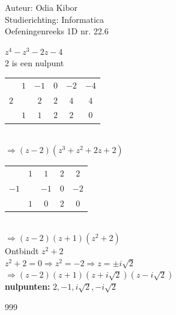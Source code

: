 \documentclass[a4paper]{article}
\begin{document}
  
\noindent \large Auteur: Odia Kibor \\
\noindent \large Studierichting: Informatica\\
\noindent \large Oefeningenreeks 1D nr. 22.6\\

\medskip

\normalsize

$z^4 - z^3 - 2z - 4$\\

$2$ is een nulpunt\\

\begin{tabular}{c|ccccc}
		& $1$ & $-1$  & $0$ & $-2$ & $-4$\\
$2$ 	&     & $2$ & $2$ & $4$ & $4$\\ \hline
		& $1$ & $1$  & $2$ & $2$ & $0$\\
\end{tabular}\\

$\Rightarrow (z - 2)(z^3 + z^2 + 2z + 2)$\\

\begin{tabular}{c|cccc}
		& $1$ & $1$  & $2$ & $2$ \\
$-1$ 	&     & $-1$ & $0$ & $-2$\\ \hline
		& $1$ & $0$  & $2$ & $0$\\
\end{tabular}\\

$\Rightarrow (z - 2)(z + 1)(z^2 + 2)$\\

Ontbindt $z^2 + 2$\\

$z^2 + 2 = 0 \Rightarrow z^2 = -2 \Rightarrow z = \pm i\sqrt{2}$\\

$\Rightarrow (z - 2)(z + 1)(z + i\sqrt{2})(z - i\sqrt{2})$\\

\textbf{nulpunten:} $2, -1, i\sqrt{2},  -i\sqrt{2}$









\begin{thebibliography}{999}
\end{thebibliography}
\end{document}
